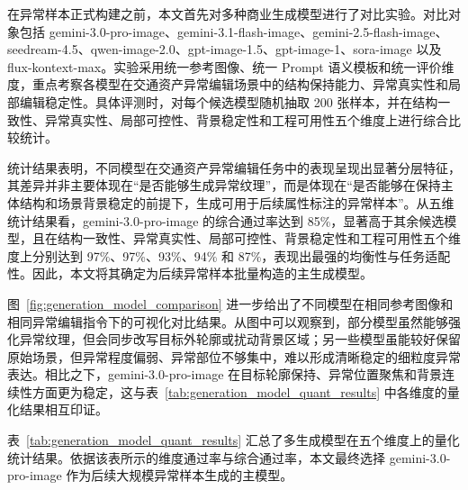 在异常样本正式构建之前，本文首先对多种商业生成模型进行了对比实验。对比对象包括 gemini-3.0-pro-image、gemini-3.1-flash-image、gemini-2.5-flash-image、seedream-4.5、qwen-image-2.0、gpt-image-1.5、gpt-image-1、sora-image 以及 flux-kontext-max。实验采用统一参考图像、统一 Prompt 语义模板和统一评价维度，重点考察各模型在交通资产异常编辑场景中的结构保持能力、异常真实性和局部编辑稳定性。具体评测时，对每个候选模型随机抽取 200 张样本，并在结构一致性、异常真实性、局部可控性、背景稳定性和工程可用性五个维度上进行综合比较统计。

统计结果表明，不同模型在交通资产异常编辑任务中的表现呈现出显著分层特征，其差异并非主要体现在“是否能够生成异常纹理”，而是体现在“是否能够在保持主体结构和场景背景稳定的前提下，生成可用于后续属性标注的异常样本”。从五维统计结果看，gemini-3.0-pro-image 的综合通过率达到 85\%，显著高于其余候选模型，且在结构一致性、异常真实性、局部可控性、背景稳定性和工程可用性五个维度上分别达到 97\%、97\%、93\%、94\% 和 87\%，表现出最强的均衡性与任务适配性。因此，本文将其确定为后续异常样本批量构造的主生成模型。

图~\ref{fig:generation_model_comparison} 进一步给出了不同模型在相同参考图像和相同异常编辑指令下的可视化对比结果。从图中可以观察到，部分模型虽然能够强化异常纹理，但会同步改写目标外轮廓或扰动背景区域；另一些模型虽能较好保留原始场景，但异常程度偏弱、异常部位不够集中，难以形成清晰稳定的细粒度异常表达。相比之下，gemini-3.0-pro-image 在目标轮廓保持、异常位置聚焦和背景连续性方面更为稳定，这与表~\ref{tab:generation_model_quant_results} 中各维度的量化结果相互印证。

表~\ref{tab:generation_model_quant_results} 汇总了多生成模型在五个维度上的量化统计结果。依据该表所示的维度通过率与综合通过率，本文最终选择 gemini-3.0-pro-image 作为后续大规模异常样本生成的主模型。

\begin{table}[htbp]
\centering
\caption{多生成模型在交通资产异常编辑任务上的五维统计结果}
\label{tab:generation_model_quant_results}
\end{table}

